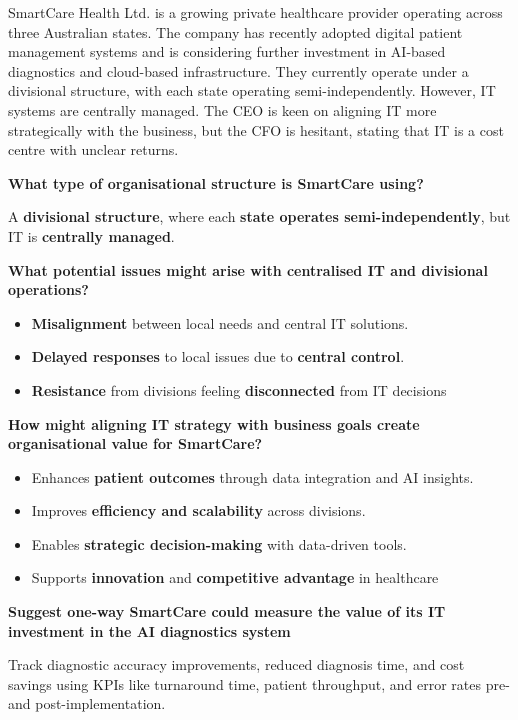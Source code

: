 SmartCare Health Ltd. is a growing private healthcare provider operating across three Australian states. The company has recently adopted digital patient management systems and is considering further investment in AI-based diagnostics and cloud-based infrastructure. They currently operate under a divisional structure, with each state operating semi-independently. However, IT systems are centrally managed. The CEO is keen on aligning IT more strategically with the business, but the CFO is hesitant, stating that IT is a cost centre with unclear returns.

\bigskip

\noindent\textbf{What type of organisational structure is SmartCare using?}

A \textbf{divisional structure}, where each \textbf{state operates semi-independently}, but IT is \textbf{centrally managed}.

\noindent\textbf{What potential issues might arise with centralised IT and divisional operations?}

\begin{itemize}
    \item \textbf{Misalignment} between local needs and central IT solutions.
    \item \textbf{Delayed responses} to local issues due to \textbf{central control}.
    \item \textbf{Resistance} from divisions feeling \textbf{disconnected} from IT decisions
\end{itemize}


\noindent\textbf{How might aligning IT strategy with business goals create organisational value for SmartCare?}

\begin{itemize}
    \item Enhances \textbf{patient outcomes} through data integration and AI insights.
    \item Improves \textbf{efficiency and scalability} across divisions.
    \item Enables \textbf{strategic decision-making} with data-driven tools.
    \item Supports \textbf{innovation} and \textbf{competitive advantage} in healthcare
\end{itemize}

\noindent\textbf{Suggest one-way SmartCare could measure the value of its IT investment in the AI diagnostics system}

Track diagnostic accuracy improvements, reduced diagnosis time, and cost savings using KPIs like turnaround time, patient throughput, and error rates pre- and post-implementation.
